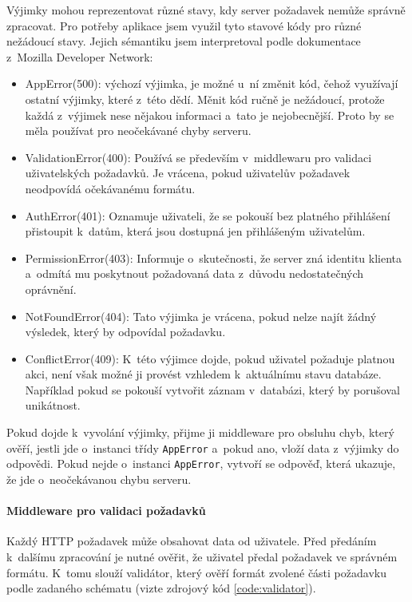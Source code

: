 \documentclass[
  tables=false,
  glossaries,
  index
]{kidiplom}
\begin{document}
Výjimky mohou reprezentovat různé stavy, kdy server požadavek nemůže správně zpracovat. Pro potřeby aplikace jsem využil tyto stavové kódy pro různé nežádoucí stavy. Jejich sémantiku jsem interpretoval podle dokumentace z~Mozilla Developer Network\cite{mdn-status}:
\begin{itemize}
	\item AppError(500): výchozí výjimka, je možné u~ní změnit kód, čehož využívají ostatní výjimky, které z~této dědí. Měnit kód ručně je nežádoucí, protože každá z~výjimek nese nějakou informaci a~tato je nejobecnější. Proto by se měla používat pro neočekávané chyby serveru.
	\item ValidationError(400): Používá se především v~middlewaru pro validaci uživatelských požadavků. Je vrácena, pokud uživatelův požadavek neodpovídá očekávanému formátu.
	\item AuthError(401): Oznamuje uživateli, že se pokouší bez platného přihlášení přistoupit k~datům, která jsou dostupná jen přihlášeným uživatelům.
	\item PermissionError(403): Informuje o~skutečnosti, že server zná identitu klienta a~odmítá mu poskytnout požadovaná data z~důvodu nedostatečných oprávnění.
	\item NotFoundError(404): Tato výjimka je vrácena, pokud nelze najít žádný výsledek, který by odpovídal požadavku.
	\item ConflictError(409): K~této výjimce dojde, pokud uživatel požaduje platnou akci, není však možné ji provést vzhledem k~aktuálnímu stavu databáze. Například pokud se pokouší vytvořit záznam v~databázi, který by porušoval unikátnost.
\end{itemize}

Pokud dojde k~vyvolání výjimky, přijme ji middleware pro obsluhu chyb, který ověří, jestli jde o~instanci třídy \texttt{AppError} a~pokud ano, vloží data z~výjimky do odpovědi. Pokud nejde o~instanci \texttt{AppError}, vytvoří se odpověď, která ukazuje, že jde o~neočekávanou chybu serveru.


\paragraph{Middleware pro validaci požadavků}
Každý HTTP požadavek může obsahovat data od uživatele. Před předáním k~dalšímu zpracování je nutné ověřit, že uživatel předal požadavek ve správném formátu. K~tomu slouží validátor, který ověří formát zvolené části požadavku podle zadaného schématu (vizte zdrojový kód \ref{code:validator}).
\end{document}
